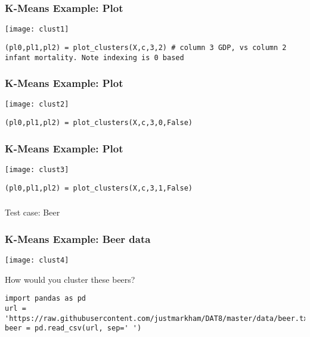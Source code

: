 \begin{frame}[fragile]\frametitle{K-Means Example: Plot}

\begin{center}
\texttt{[image: clust1]}
\end{center}


\begin{lstlisting}
(pl0,pl1,pl2) = plot_clusters(X,c,3,2) # column 3 GDP, vs column 2 infant mortality. Note indexing is 0 based
\end{lstlisting}

\end{frame}
\begin{frame}[fragile]\frametitle{K-Means Example: Plot}

\begin{center}
\texttt{[image: clust2]}
\end{center}


\begin{lstlisting}
(pl0,pl1,pl2) = plot_clusters(X,c,3,0,False)
\end{lstlisting}

\end{frame}

\begin{frame}[fragile]\frametitle{K-Means Example: Plot}

\begin{center}
\texttt{[image: clust3]}
\end{center}

\begin{lstlisting}
(pl0,pl1,pl2) = plot_clusters(X,c,3,1,False)
\end{lstlisting}

\end{frame}

\begin{frame}[fragile]\frametitle{}
\begin{center}
{\Large Test case: Beer}
\end{center}
\end{frame}


\begin{frame}[fragile]\frametitle{K-Means Example: Beer data}

\begin{center}
\texttt{[image: clust4]}
\end{center}

How would you cluster these beers?


\begin{lstlisting}
import pandas as pd
url = 'https://raw.githubusercontent.com/justmarkham/DAT8/master/data/beer.txt'
beer = pd.read_csv(url, sep=' ')
\end{lstlisting}

\end{frame}


